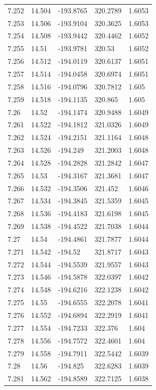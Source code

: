 \begin{tabular}{lllll}
7.252 & 14.504 & -193.8765 & 320.2789 & 1.6053 \\
7.253 & 14.506 & -193.9104 & 320.3625 & 1.6053 \\
7.254 & 14.508 & -193.9442 & 320.4462 & 1.6052 \\
7.255 & 14.51 & -193.9781 & 320.53 & 1.6052 \\
7.256 & 14.512 & -194.0119 & 320.6137 & 1.6051 \\
7.257 & 14.514 & -194.0458 & 320.6974 & 1.6051 \\
7.258 & 14.516 & -194.0796 & 320.7812 & 1.605 \\
7.259 & 14.518 & -194.1135 & 320.865 & 1.605 \\
7.26 & 14.52 & -194.1474 & 320.9488 & 1.6049 \\
7.261 & 14.522 & -194.1812 & 321.0326 & 1.6049 \\
7.262 & 14.524 & -194.2151 & 321.1164 & 1.6048 \\
7.263 & 14.526 & -194.249 & 321.2003 & 1.6048 \\
7.264 & 14.528 & -194.2828 & 321.2842 & 1.6047 \\
7.265 & 14.53 & -194.3167 & 321.3681 & 1.6047 \\
7.266 & 14.532 & -194.3506 & 321.452 & 1.6046 \\
7.267 & 14.534 & -194.3845 & 321.5359 & 1.6045 \\
7.268 & 14.536 & -194.4183 & 321.6198 & 1.6045 \\
7.269 & 14.538 & -194.4522 & 321.7038 & 1.6044 \\
7.27 & 14.54 & -194.4861 & 321.7877 & 1.6044 \\
7.271 & 14.542 & -194.52 & 321.8717 & 1.6043 \\
7.272 & 14.544 & -194.5539 & 321.9557 & 1.6043 \\
7.273 & 14.546 & -194.5878 & 322.0397 & 1.6042 \\
7.274 & 14.548 & -194.6216 & 322.1238 & 1.6042 \\
7.275 & 14.55 & -194.6555 & 322.2078 & 1.6041 \\
7.276 & 14.552 & -194.6894 & 322.2919 & 1.6041 \\
7.277 & 14.554 & -194.7233 & 322.376 & 1.604 \\
7.278 & 14.556 & -194.7572 & 322.4601 & 1.604 \\
7.279 & 14.558 & -194.7911 & 322.5442 & 1.6039 \\
7.28 & 14.56 & -194.825 & 322.6283 & 1.6039 \\
7.281 & 14.562 & -194.8589 & 322.7125 & 1.6038 \\

\end{tabular}
